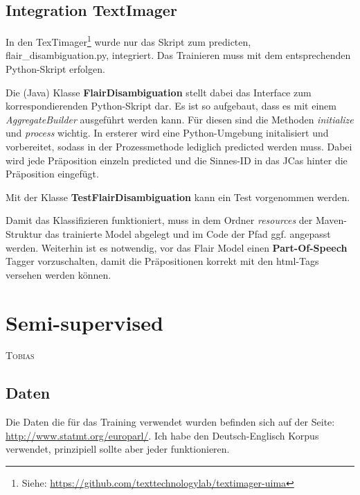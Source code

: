 \documentclass[10pt,a4paper]{article}
\newcommand{\chapterauthor}[1]{%
	{\parindent0pt\vspace*{-5pt}\hspace*{\fill}%
  \linespread{1.1}\large\scshape#1%
  \par\nobreak\vspace*{10pt}}
}
\begin{document}
\subsection{Integration TextImager}
\begin{flushleft}
In den TexTimager\footnote{Siehe: \url{https://github.com/texttechnologylab/textimager-uima}} wurde nur das Skript zum predicten, flair\_disambiguation.py, integriert. Das Trainieren muss mit dem entsprechenden Python-Skript erfolgen.

Die (Java) Klasse \textbf{FlairDisambiguation} stellt dabei das Interface zum korrespondierenden Python-Skript dar. Es ist so aufgebaut, dass es mit einem \textit{AggregateBuilder} ausgeführt werden kann. Für diesen sind die Methoden \textit{initialize} und \textit{process} wichtig. In ersterer wird eine Python-Umgebung initalisiert und vorbereitet, sodass in der Prozessmethode lediglich predicted werden muss. Dabei wird jede Präposition einzeln predicted und die Sinnes-ID in das JCas hinter die Präposition eingefügt.

Mit der Klasse \textbf{TestFlairDisambiguation} kann ein Test vorgenommen werden.

Damit das Klassifizieren funktioniert, muss in dem Ordner \textit{resources} der Maven-Struktur das trainierte Model abgelegt und im Code der Pfad ggf. angepasst werden. Weiterhin ist es notwendig, vor das Flair Model einen \textbf{Part-Of-Speech} Tagger vorzuschalten, damit die Präpositionen korrekt mit den html-Tags versehen werden können.
\end{flushleft}

\newpage

\section{Semi-supervised}
\chapterauthor{Tobias}
\subsection{Daten}
\begin{flushleft}
Die Daten die für das Training verwendet wurden befinden sich auf der Seite: \url{http://www.statmt.org/europarl/}. Ich habe den Deutsch-Englisch Korpus verwendet, prinzipiell sollte aber jeder funktionieren.
\end{flushleft}
\end{document}
